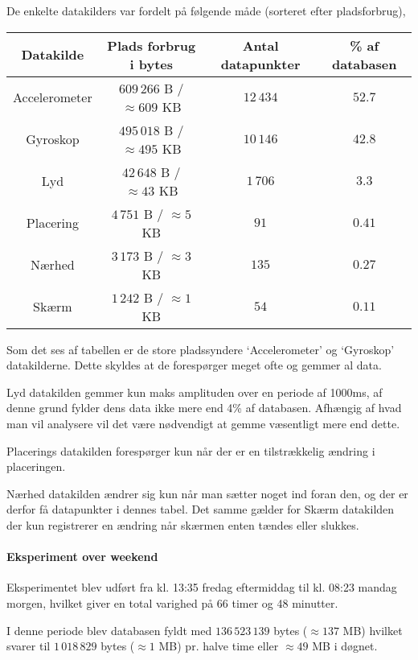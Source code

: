 De enkelte datakilders var fordelt på følgende måde (sorteret efter pladsforbrug),

\begin{tabular}{|c|c|c|c|}
	\hline Datakilde		& Plads forbrug i bytes				& Antal datapunkter  & \% af databasen \\
	\hline Accelerometer 	& $609\,266$ B / $\approx609$ KB	& $12\,434$ 		 & $52.7$ \\ 
	\hline Gyroskop 		& $495\,018$ B / $\approx495$ KB	& $10\,146$ 		 & $42.8$\\ 
	\hline Lyd 				& $42\,648$ B / $\approx43$ KB		& $1\,706$ 			 & $3.3$ \\ 
	\hline Placering 		& $4\,751$ B / $\approx5$ KB		& $91$ 				 & $0.41$ \\ 
	\hline Nærhed    		& $3\,173$ B / $\approx3$ KB		& $135$ 			 & $0.27$ \\ 
	\hline Skærm 			& $1\,242$ B / $\approx1$	KB		& $54$				 & $0.11$ \\ 
	\hline 
\end{tabular} 

Som det ses af tabellen er de store pladssyndere `Accelerometer' og `Gyroskop' datakilderne.
Dette skyldes at de forespørger meget ofte og gemmer al data.

Lyd datakilden gemmer kun maks amplituden over en periode af 1000ms, af denne grund fylder dens data ikke mere end 4\% af databasen.
Afhængig af hvad man vil analysere vil det være nødvendigt at gemme væsentligt mere end dette.

Placerings datakilden forespørger kun når der er en tilstrækkelig ændring i placeringen.

Nærhed datakilden ændrer sig kun når man sætter noget ind foran den, og der er derfor få datapunkter i dennes tabel.
Det samme gælder for Skærm datakilden der kun registrerer en ændring når skærmen enten tændes eller slukkes.	

\paragraph{Eksperiment over weekend}
Eksperimentet blev udført fra kl. 13:35 fredag eftermiddag til kl. 08:23 mandag morgen, hvilket giver en total varighed på 66 timer og 48 minutter.

I denne periode blev databasen fyldt med  $136\,523\,139$ bytes ($\approx137$ MB) hvilket svarer til $1\,018\,829$ bytes ($\approx1$ MB) pr. halve time eller $\approx49$ MB i døgnet.


